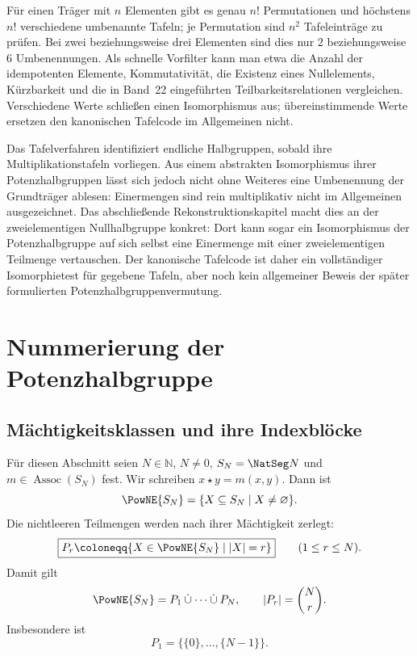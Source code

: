 \documentclass[main.tex]{subfiles}
\begin{document}
Für einen Träger mit \(n\) Elementen gibt es genau \(n!\) Permutationen und
höchstens \(n!\) verschiedene umbenannte Tafeln; je Permutation sind \(n^2\)
Tafeleinträge zu prüfen.  Bei
zwei beziehungsweise drei Elementen sind dies nur \(2\) beziehungsweise
\(6\) Umbenennungen.  Als schnelle Vorfilter kann man etwa die Anzahl der
idempotenten Elemente, Kommutativität, die Existenz eines Nullelements,
Kürzbarkeit und die in Band~22 eingeführten Teilbarkeitsrelationen
vergleichen.  Verschiedene Werte schließen einen Isomorphismus aus;
übereinstimmende Werte ersetzen den kanonischen Tafelcode im Allgemeinen
nicht.

\begin{remark}
Das Tafelverfahren identifiziert endliche Halbgruppen, sobald ihre
Multiplikationstafeln vorliegen.  Aus einem abstrakten Isomorphismus ihrer
Potenzhalbgruppen lässt sich jedoch nicht ohne Weiteres eine Umbenennung der
Grundträger ablesen: Einermengen sind rein multiplikativ nicht im
Allgemeinen ausgezeichnet.  Das abschließende Rekonstruktionskapitel macht
dies an der zweielementigen Nullhalbgruppe konkret: Dort kann sogar ein
Isomorphismus der Potenzhalbgruppe auf sich selbst eine Einermenge mit einer
zweielementigen Teilmenge vertauschen.  Der kanonische Tafelcode ist daher
ein vollständiger Isomorphietest für gegebene Tafeln, aber noch kein
allgemeiner Beweis der später formulierten Potenzhalbgruppenvermutung.
\end{remark}

\section{Nummerierung der Potenzhalbgruppe}

\subsection{Mächtigkeitsklassen und ihre Indexblöcke}

Für diesen Abschnitt seien \(N\in\mathbb N\), \(N\neq0\),
\(S_N=\NatSeg N\) und \(m\in\operatorname{Assoc}(S_N)\) fest.  Wir
schreiben \(x\star y=m(x,y)\).  Dann ist
\[
  \PowNE{S_N}
  =
  \{X\subseteq S_N\mid X\neq\varnothing\}.
\]
Die nichtleeren Teilmengen werden nach ihrer Mächtigkeit zerlegt:
\[
  \boxed{
  P_r
  \coloneqq
  \{X\in\PowNE{S_N}\mid |X|=r\}}
  \qquad(1\leq r\leq N).
\]
Damit gilt
\[
  \PowNE{S_N}
  =
  P_1\mathbin{\dot\cup}\cdots\mathbin{\dot\cup}P_N,
  \qquad
  |P_r|=\binom{N}{r}.
\]
Insbesondere ist
\[
  P_1=\bigl\{\{0\},\ldots,\{N-1\}\bigr\}.
\]
\end{document}

